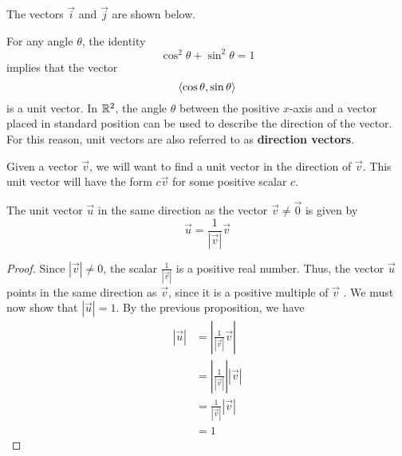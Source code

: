 \documentclass[handout]{ximera}
\begin{document}
The vectors $\vec{i}$ and $\vec{j}$ are shown below.

\begin{image}
\end{image}

For any angle $\theta$, the identity 
\[
\cos^2 \theta + \sin^2 \theta = 1
\]
 implies that the vector 
 \[
 \left\langle \cos \theta, \sin \theta\right\rangle
 \]
is a unit vector. In $\mathbb R^2$, the angle $\theta$ between the positive $x$-axis and a vector placed in standard position can be used to describe the direction of the vector.  
For this reason, unit vectors are also referred to as {\bf direction vectors}.

\begin{image}
\end{image}

Given a vector $\vec{v}$, we will want to find a unit vector in the direction of $\vec{v}$.
This unit vector will have the form $c\vec{v}$ for some positive scalar $c$.  
\begin{proposition}
The unit vector $\vec{u}$ in the same direction as the vector $\vec{v} \neq \vec{0}$ is given by 
\[
\vec{u} = \frac{1}{|\vec{v}|} \vec{v}
\]
\begin{proof}
Since $|\vec{v}| \neq 0$, the scalar $\displaystyle \frac{1}{|\vec{v}|}$ is a positive real number.  Thus, the vector $\vec{u}$ points 
in the same direction as $\vec{v}$, since it is a positive multiple of $\vec{v}$ . We must now show that $|\vec{u}| = 1$.  
By the previous proposition, we have
\begin{align*}
|\vec{u}| &= \left| \frac{1}{|\vec{v}|} \vec{v} \right|\\
           &= \left| \frac{1}{|\vec{v}|} \right| |\vec{v}|\\
           &= \frac{1}{|\vec{v}|} |\vec{v}|\\
           &= 1
\end{align*}
\end{proof}
\end{proposition}
\end{document}
